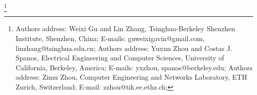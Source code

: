\documentclass[acmlarge]{acmart}
\begin{document}
%

%
%


\thanks{
Authors address: Weixi Gu and Lin Zhang, Tsinghua-Berkeley Shenzhen Institute, Shenzhen, China;
E-mails: guweixigavin@gmail.com, linzhang@tsinghua.edu.cn;
Authors address: Yuxun Zhou and Costas J. Spanos, Electrical Engineering and Computer Sciences, University of California, Berkeley, America;
E-mails: {yxzhou, spanos}@berkeley.edu;
Authors address: Zimu Zhou, Computer Engineering and Networks Laboratory, ETH Zurich, Switzerland;
E-mail: zzhou@tik.ee.ethz.ch;
}

\maketitle




%




%




\end{document}
